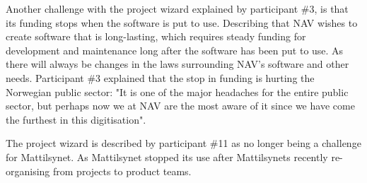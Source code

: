 
Another challenge with the project wizard explained by participant \#3, is that its funding stops when the software is put to use. Describing that NAV wishes to create software that is long-lasting, which requires steady funding for development and maintenance long after the software has been put to use. As there will always be changes in the laws surrounding NAV's software and other needs. Participant \#3 explained that the stop in funding is hurting the Norwegian public sector: "It is one of the major headaches for the entire public sector, but perhaps now we at NAV are the most aware of it since we have come the furthest in this digitisation".


The project wizard is described by participant \#11 as no longer being a challenge for Mattilsynet. As Mattilsynet stopped its use after Mattilsynets recently re-organising from projects to product teams.

